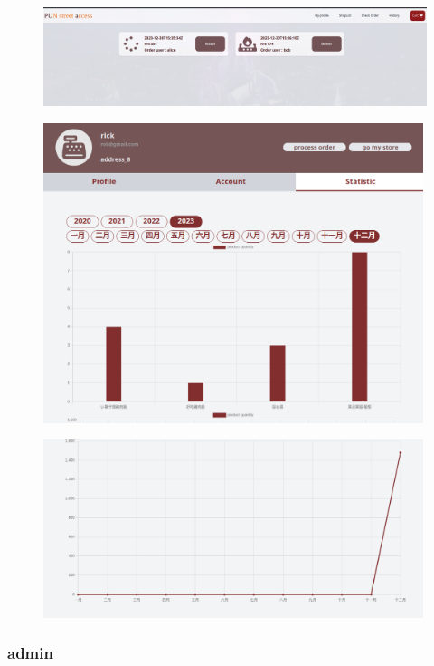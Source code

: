 \documentclass[a4paper, 12pt]{article}
\begin{document}
\newline
{}
\begin{figure}[hp]
    \centerline{\includegraphics[width=40em]{gui-snapshot/seller/order-status.png}}
    \label{fig:enter-label}
\end{figure}
\newpage
{}
\begin{figure}[hp]
    \centerline{\includegraphics[width=30em]{gui-snapshot/seller/statistic.png}}
    \label{fig:enter-label}
\end{figure}
\begin{figure}[hp]
    \centerline{\includegraphics[width=30em]{gui-snapshot/seller/statistic-1.png}}
    \label{fig:enter-label}
\end{figure}
\newpage

\subsubsection{admin}
\end{document}
